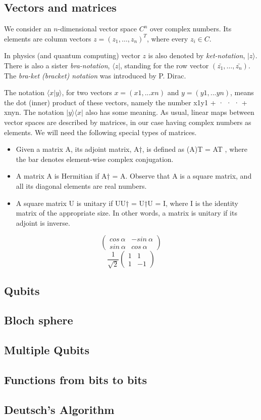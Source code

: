 \subsection{Vectors and matrices}
We consider an $n$-dimensional vector space $C^n$ over complex numbers.
Its elements are column vectors $z = (z_1,\dots,z_n)^T$,
where every $z_i \in C$.

In physics (and quantum computing) vector $z$ is also denoted by \textit{ket-notation},
$|z\rangle$.
There is also a sister \textit{bra-notation}, $\langle z|$,
standing for the row vector $(\bar{z_1}, \dots , \bar{z_n})$.
The \textit{bra-ket (bracket) notation} was introduced by P. Dirac.

The notation $\langle x|y \rangle$,
for two vectors $x = (x1, . . . xn)$ and $y = (y1, . . . yn)$,
means the dot (inner) product of these vectors,
namely the number x1y1 + · · · + xnyn.
The notation $|y\rangle\langle x|$ also has some meaning.
As usual, linear maps between vector spaces are described by matrices,
in our case having complex numbers as elements.
We will need the following special types of matrices.
\begin{itemize}
    \item Given a matrix A,
    its adjoint matrix,
    A†, is defined as (A)T = AT ,
    where the bar denotes element-wise complex conjugation.
    \item A matrix A is Hermitian if A† = A. Observe that A is a square matrix, and all its diagonal elements are real numbers.
    \item A square matrix U is unitary if UU† = U†U = I,
    where I is the identity matrix of the appropriate size. In other words, a matrix is unitary if its adjoint is inverse.
\end{itemize}

$$
\begin{pmatrix}
    cos\ \alpha & -sin\ \alpha  \\
    sin\ \alpha & cos\ \alpha
\end{pmatrix}
$$
$$
\frac{1}{\sqrt{2}}
\begin{pmatrix}
    1 & 1  \\
    1 & -1
\end{pmatrix}
$$
\subsection{Qubits}
\subsection{Bloch sphere}
\subsection{Multiple Qubits}
\subsection{Functions from bits to bits}
\subsection{Deutsch’s Algorithm}
